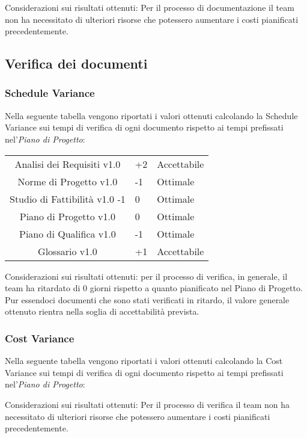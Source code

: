 
Considerazioni sui risultati ottenuti: Per il processo di documentazione il team non ha necessitato di ulteriori risorse che potessero aumentare i costi pianificati precedentemente.

\subsection{Verifica dei documenti}
\subsubsection{Schedule Variance}
Nella seguente tabella vengono riportati i valori ottenuti calcolando la Schedule Variance sui tempi di verifica di ogni documento rispetto ai tempi prefissati nel'\textit{Piano di Progetto}:

{
	\centering
	\begin{tabular}{| c | R{0.5cm} | C{3cm} |}
		Analisi dei Requisiti v1.0 & +2 & Accettabile \\
		Norme di Progetto v1.0 & -1 & Ottimale \\
		Studio di Fattibilità v1.0 -1 &  0 &  Ottimale \\
		Piano di Progetto v1.0 &  0 &  Ottimale\\
		Piano di Qualifica v1.0 & -1 & Ottimale \\
		Glossario v1.0 & +1 & Accettabile\\	
	\end{tabular}
}


Considerazioni sui risultati ottenuti: per il processo di verifica, in generale, il team ha ritardato di 0 giorni rispetto a quanto pianificato nel Piano di Progetto. Pur essendoci documenti che sono stati verificati in ritardo, il valore generale ottenuto rientra nella soglia di accettabilità prevista.

\subsubsection{Cost Variance}
Nella seguente tabella vengono riportati i valori ottenuti calcolando la Cost Variance sui tempi di verifica di ogni documento rispetto ai tempi prefissati nel'\textit{Piano di Progetto}:


Considerazioni sui risultati ottenuti: Per il processo di verifica il team non ha necessitato di ulteriori risorse che potessero aumentare i costi pianificati precedentemente.


